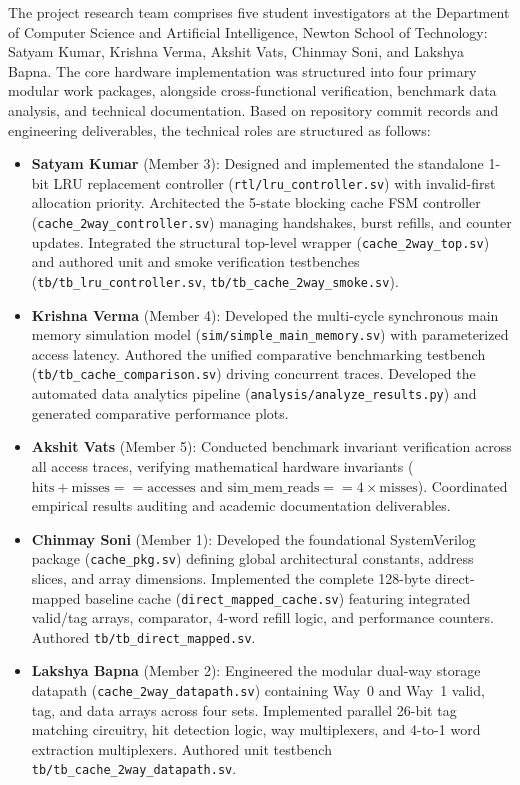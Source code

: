 \documentclass[conference]{IEEEtran}
\begin{document}
The project research team comprises five student investigators at the Department of Computer Science and Artificial Intelligence, Newton School of Technology: Satyam Kumar, Krishna Verma, Akshit Vats, Chinmay Soni, and Lakshya Bapna. The core hardware implementation was structured into four primary modular work packages, alongside cross-functional verification, benchmark data analysis, and technical documentation. Based on repository commit records and engineering deliverables, the technical roles are structured as follows:

\begin{itemize}
    \item \textbf{Satyam Kumar} (Member 3): Designed and implemented the standalone 1-bit LRU replacement controller (\texttt{rtl/lru\_controller.sv}) with invalid-first allocation priority. Architected the 5-state blocking cache FSM controller (\texttt{cache\_2way\_controller.sv}) managing handshakes, burst refills, and counter updates. Integrated the structural top-level wrapper (\texttt{cache\_2way\_top.sv}) and authored unit and smoke verification testbenches (\texttt{tb/tb\_lru\_controller.sv}, \texttt{tb/tb\_cache\_2way\_smoke.sv}).
    \item \textbf{Krishna Verma} (Member 4): Developed the multi-cycle synchronous main memory simulation model (\texttt{sim/simple\_main\_memory.sv}) with parameterized access latency. Authored the unified comparative benchmarking testbench (\texttt{tb/tb\_cache\_comparison.sv}) driving concurrent traces. Developed the automated data analytics pipeline (\texttt{analysis/analyze\_results.py}) and generated comparative performance plots.
    \item \textbf{Akshit Vats} (Member 5): Conducted benchmark invariant verification across all access traces, verifying mathematical hardware invariants ($\text{hits} + \text{misses} == \text{accesses}$ and $\text{sim\_mem\_reads} == 4 \times \text{misses}$). Coordinated empirical results auditing and academic documentation deliverables.
    \item \textbf{Chinmay Soni} (Member 1): Developed the foundational SystemVerilog package (\texttt{cache\_pkg.sv}) defining global architectural constants, address slices, and array dimensions. Implemented the complete 128-byte direct-mapped baseline cache (\texttt{direct\_mapped\_cache.sv}) featuring integrated valid/tag arrays, comparator, 4-word refill logic, and performance counters. Authored \texttt{tb/tb\_direct\_mapped.sv}.
    \item \textbf{Lakshya Bapna} (Member 2): Engineered the modular dual-way storage datapath (\texttt{cache\_2way\_datapath.sv}) containing Way~0 and Way~1 valid, tag, and data arrays across four sets. Implemented parallel 26-bit tag matching circuitry, hit detection logic, way multiplexers, and 4-to-1 word extraction multiplexers. Authored unit testbench \texttt{tb/tb\_cache\_2way\_datapath.sv}.
\end{itemize}
\end{document}

